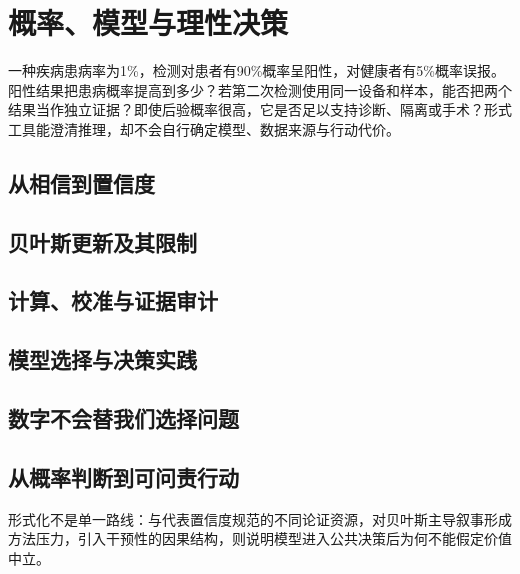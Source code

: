\chapter{概率、模型与理性决策}

\begin{openingcase}
一种疾病患病率为1\%，检测对患者有90\%概率呈阳性，对健康者有5\%概率误报。阳性结果把患病概率提高到多少？若第二次检测使用同一设备和样本，能否把两个结果当作独立证据？即使后验概率很高，它是否足以支持诊断、隔离或手术？形式工具能澄清推理，却不会自行确定模型、数据来源与行动代价。
\end{openingcase}

\section{从相信到置信度}


\section{贝叶斯更新及其限制}


\section{计算、校准与证据审计}


\section{模型选择与决策实践}



\section{数字不会替我们选择问题}



\section{从概率判断到可问责行动}


形式化不是单一路线：\textcite{ramsey1931}与\textcite{pettigrew2016}代表置信度规范的不同论证资源，\textcite{mayo2018}对贝叶斯主导叙事形成方法压力，\textcite{pearl2009}引入干预性的因果结构，\textcite{douglas2009}则说明模型进入公共决策后为何不能假定价值中立。

